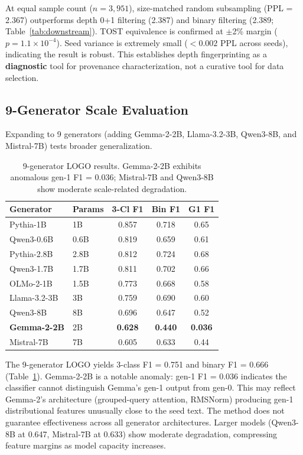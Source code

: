 \documentclass[11pt,a4paper]{article}
\begin{document}
At equal sample count ($n = 3{,}951$), size-matched random subsampling (PPL = 2.367) outperforms depth 0+1 filtering (2.387) and binary filtering (2.389; Table~\ref{tab:downstream}).
TOST equivalence is confirmed at $\pm$2\% margin ($p = 1.1 \times 10^{-4}$).
Seed variance is extremely small ($< 0.002$ PPL across seeds), indicating the result is robust.
This establishes depth fingerprinting as a \textbf{diagnostic} tool for provenance characterization, not a curative tool for data selection.

\subsection{9-Generator Scale Evaluation}
\label{sec:9gen}

Expanding to 9 generators (adding Gemma-2-2B, Llama-3.2-3B, Qwen3-8B, and Mistral-7B) tests broader generalization.

\begin{table}[t]
\centering
\small
\begin{tabular}{llccc}
\toprule
\textbf{Generator} & \textbf{Params} & \textbf{3-Cl F1} & \textbf{Bin F1} & \textbf{G1 F1} \\
\midrule
Pythia-1B & 1B & 0.857 & 0.718 & 0.65 \\
Qwen3-0.6B & 0.6B & 0.819 & 0.659 & 0.61 \\
Pythia-2.8B & 2.8B & 0.812 & 0.724 & 0.68 \\
Qwen3-1.7B & 1.7B & 0.811 & 0.702 & 0.66 \\
OLMo-2-1B & 1.5B & 0.773 & 0.668 & 0.58 \\
Llama-3.2-3B & 3B & 0.759 & 0.690 & 0.60 \\
Qwen3-8B & 8B & 0.696 & 0.647 & 0.52 \\
\textbf{Gemma-2-2B} & 2B & \textbf{0.628} & \textbf{0.440} & \textbf{0.036} \\
Mistral-7B & 7B & 0.605 & 0.633 & 0.44 \\
\bottomrule
\end{tabular}
\caption{9-generator LOGO results. Gemma-2-2B exhibits anomalous gen-1 F1 = 0.036; Mistral-7B and Qwen3-8B show moderate scale-related degradation.}
\label{tab:9gen}
\end{table}

The 9-generator LOGO yields 3-class F1 = 0.751 and binary F1 = 0.666 (Table~\ref{tab:9gen}).
Gemma-2-2B is a notable anomaly: gen-1 F1 = 0.036 indicates the classifier cannot distinguish Gemma's gen-1 output from gen-0.
This may reflect Gemma-2's architecture (grouped-query attention, RMSNorm) producing gen-1 distributional features unusually close to the seed text.
The method does not guarantee effectiveness across all generator architectures.
Larger models (Qwen3-8B at 0.647, Mistral-7B at 0.633) show moderate degradation, compressing feature margins as model capacity increases.
\end{document}
